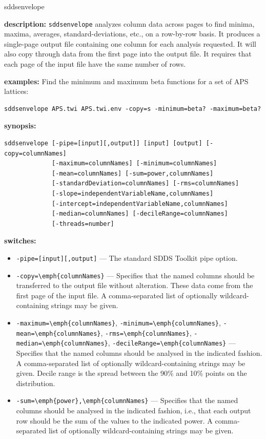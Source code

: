 \begin{sddsprog}{sddsenvelope}
  \item \textbf{description:} {\tt sddsenvelope} analyzes column data across pages to find minima, maxima, averages, standard-deviations, etc., on a row-by-row basis. It produces a single-page output file containing one column for each analysis requested. It will also copy through data from the first page into the output file. It requires that each page of the input file have the same number of rows.
  \item \textbf{examples:} Find the minimum and maximum beta functions for a set of APS lattices:
  \begin{verbatim}
sddsenvelope APS.twi APS.twi.env -copy=s -minimum=beta? -maximum=beta?
  \end{verbatim}
  \item \textbf{synopsis:}
  \begin{verbatim}
sddsenvelope [-pipe=[input][,output]] [input] [output] [-copy=columnNames]
             [-maximum=columnNames] [-minimum=columnNames]
             [-mean=columnNames] [-sum=power,columnNames]
             [-standardDeviation=columnNames] [-rms=columnNames]
             [-slope=independentVariableName,columnNames]
             [-intercept=independentVariableName,columnNames]
             [-median=columnNames] [-decileRange=columnNames]
             [-threads=number]
  \end{verbatim}
  \item \textbf{switches:}
  \begin{itemize}
    \item \verb|-pipe=[input][,output]| --- The standard SDDS Toolkit pipe option.
    \item \verb|-copy=\emph{columnNames}| --- Specifies that the named columns should be transferred to the output file without alteration. These data come from the first page of the input file. A comma-separated list of optionally wildcard-containing strings may be given.
    \item \verb|-maximum=\emph{columnNames}|, \verb|-minimum=\emph{columnNames}|, \verb|-mean=\emph{columnNames}|, \verb|-rms=\emph{columnNames}|, \verb|-median=\emph{columnNames}|, \verb|-decileRange=\emph{columnNames}| --- Specifies that the named columns should be analysed in the indicated fashion. A comma-separated list of optionally wildcard-containing strings may be given. Decile range is the spread between the 90\% and 10\% points on the distribution.
    \item \verb|-sum=\emph{power},\emph{columnNames}| --- Specifies that the named columns should be analysed in the indicated fashion, i.e., that each output row should be the sum of the values to the indicated power. A comma-separated list of optionally wildcard-containing strings may be given.

\end{itemize}
\end{sddsprog}
